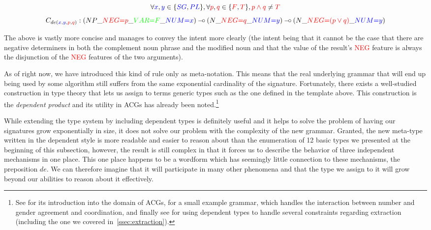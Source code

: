 $$
\forall \textcolor{blue}{x}, \textcolor{blue}{y} \in\{\textcolor{blue}{SG}, \textcolor{blue}{PL}\}, \forall \textcolor{red}{p}, \textcolor{red}{q} \in \{\textcolor{red}{F}, \textcolor{red}{T}\}, \textcolor{red}{p \land q} \neq \textcolor{red}{T}
$$
$$
C_{de(\textcolor{blue}{x}, \textcolor{blue}{y}, \textcolor{red}{p}, \textcolor{red}{q})} : (NP\_\textcolor{red}{NEG{=}p}\_\textcolor{green}{VAR{=}F}\_\textcolor{blue}{NUM{=}x}) \mathbin{{-}\mkern-3.5mu{\circ}} (N\_\textcolor{red}{NEG{=}q}\_\textcolor{blue}{NUM{=}y}) \mathbin{{-}\mkern-3.5mu{\circ}} (N\_\textcolor{red}{NEG{=}(p \lor q)}\_\textcolor{blue}{NUM{=}y})
$$

The above is vastly more concise and manages to convey the intent more
clearly (the intent being that it cannot be the case that there are
negative determiners in both the complement noun phrase and the modified
noun and that the value of the result's \textcolor{red}{NEG} feature is
always the disjunction of the \textcolor{red}{NEG} features of the two
arguments).

As of right now, we have introduced this kind of rule only as
meta-notation. This means that the real underlying grammar that will end
up being used by some algorithm still suffers from the same exponential
cardinality of the signature. Fortunately, there exists a well-studied
construction in type theory that lets us assign to terms generic types
such as the one defined in the template above. This construction is the
\emph{dependent product} and its utility in ACGs has already been
noted.\footnote{See \cite{de2007two} for its introduction into the
  domain of ACGs, \cite{de2007type} for a small example grammar, which
  handles the interaction between number and gender agreement and
  coordination, and finally see \cite{pogodalla2012controlling} for
  using dependent types to handle several constraints regarding
  extraction (including the one we covered in~\ref{ssec:extraction}).}

While extending the type system by including dependent types is
definitely useful and it helps to solve the problem of having our
signatures grow exponentially in size, it does not solve our problem
with the complexity of the new grammar. Granted, the new meta-type
written in the dependent style is more readable and easier to reason
about than the enumeration of 12 basic types we presented at the
beginning of this subsection, however, the result is still complex in
that it forces us to describe the behavior of three independent
mechanisms in one place. This one place happens to be a wordform which
has seemingly little connection to these mechanisms, the preposition
$de$. We can therefore imagine that it will participate in many other
phenomena and that the type we assign to it will grow beyond our
abilities to reason about it effectively.


